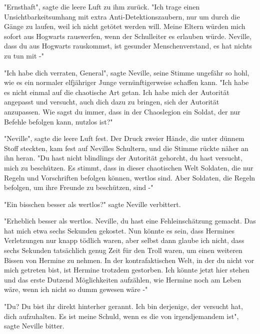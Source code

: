 {"Ernsthaft", sagte die leere Luft zu ihm zurück. "Ich trage einen Unsichtbarkeitsumhang mit extra Anti-Detektionszaubern, nur um durch die Gänge zu laufen, weil ich nicht getötet werden will. Meine Eltern würden mich sofort aus Hogwarts rauswerfen, wenn der Schulleiter es erlauben würde. Neville, dass du aus Hogwarts rauskommst, ist gesunder Menschenverstand, es hat nichts zu tun mit -"

"Ich habe dich verraten, General", sagte Neville, seine Stimme ungefähr so hohl, wie es ein normaler elfjähriger Junge vernünftigerweise schaffen kann. "Ich habe es nicht einmal auf die chaotische Art getan. Ich habe mich der Autorität angepasst und versucht, auch dich dazu zu bringen, sich der Autorität anzupassen. Wie sagst du immer, dass in der Chaoslegion ein Soldat, der nur Befehle befolgen kann, nutzlos ist?"

"Neville", sagte die leere Luft fest. Der Druck zweier Hände, die unter dünnem Stoff steckten, kam fest auf Nevilles Schultern, und die Stimme rückte näher an ihn heran. "Du hast nicht blindlings der Autorität gehorcht, du hast versucht, mich zu beschützen. Es stimmt, dass in dieser chaotischen Welt Soldaten, die nur Regeln und Vorschriften befolgen können, wertlos sind. Aber Soldaten, die Regeln befolgen, um ihre Freunde zu beschützen, sind -"

"Ein bisschen besser als wertlos?" sagte Neville verbittert.

"Erheblich besser als wertlos. Neville, du hast eine Fehleinschätzung gemacht. Das hat mich etwa sechs Sekunden gekostet. Nun könnte es sein, dass Hermines Verletzungen nur knapp tödlich waren, aber selbst dann glaube ich nicht, dass sechs Sekunden tatsächlich genug Zeit für den Troll waren, um einen weiteren Bissen von Hermine zu nehmen. In der kontrafaktischen Welt, in der du nicht vor mich getreten bist, ist Hermine trotzdem gestorben. Ich könnte jetzt hier stehen und das erste Dutzend Möglichkeiten aufzählen, wie Hermine noch am Leben wäre, wenn ich nicht so dumm gewesen wäre -"

"Du? Du bist ihr direkt hinterher gerannt. Ich bin derjenige, der versucht hat, dich aufzuhalten. Es ist meine Schuld, wenn es die von irgendjemandem ist", sagte Neville bitter.

}

